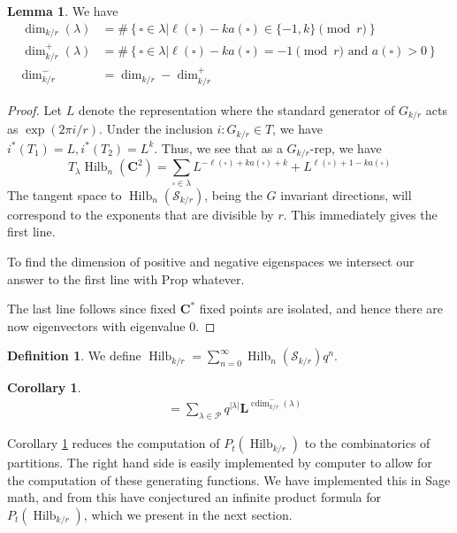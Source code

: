 \documentclass{amsart}[12pt]
\theoremstyle{definition}
\newtheorem{lemma}[dummy]{Lemma}
\newtheorem{corollary}[dummy]{Corollary}
\newtheorem{definition}[dummy]{Definition}
\newcommand{\C}{\mathbf{C}}
\newcommand{\LL}{\mathbf{L}}
\newcommand{\PP}{\mathcal{P}} %
\newcommand{\Sur}{\mathcal{S}}
\DeclareMathOperator{\Hilb}{Hilb}
\DeclareMathOperator{\cdim}{cdim}
\begin{document}
\begin{lemma} \label{lem:dimkr}
  We have
\begin{align*}
\dim_{k/r}(\lambda)&=\#\left\{\square\in\lambda \Big | \ell(\square)-k a(\square)\in\{-1,k\} \pmod r\right\} \\
\dim^+_{k/r}(\lambda)& =\#\left\{\square\in\lambda \Big | \ell(\square)-k a(\square)=-1 \pmod r \text{ and } a(\square)>0\right\} \\
\dim^-_{k/r} &= \dim_{k/r}-\dim^+_{k/r}
\end{align*}
\end{lemma}
\begin{proof}
Let $L$ denote the representation where the standard generator of $G_{k/r}$ acts as $\exp(2\pi i/r)$. Under the inclusion $i:G_{k/r}\in T$, we have $i^*(T_1)=L, i^*(T_2)=L^k$.  Thus, we see that as a $G_{k/r}$-rep, we have
$$T_\lambda \Hilb_n(\C^2)=\sum_{\square\in\lambda} L^{-\ell(\square)+ka(\square)+k}+L^{\ell(\square)+1-ka(\square)}$$
The tangent space to $\Hilb_n(\Sur_{k/r})$, being the $G$ invariant directions, will correspond to the exponents that are divisible by $r$.  This immediately gives the first line.

To find the dimension of positive and negative eigenspaces  we intersect our answer to the first line with Prop whatever.

The last line follows since fixed $\C^*$ fixed points are isolated, and hence there are now eigenvectors with eigenvalue 0.
\end{proof}

\begin{definition}
We define $\Hilb_{k/r}=\sum_{n=0}^\infty \Hilb_{n}(\Sur_{k/r})q^n$.
\end{definition}

\begin{corollary} \label{cor:orbibettipartitions}
\begin{align*} [P_t(\Hilb_{k/r})&=\sum_{\lambda\in\PP}q^{|\lambda|}t^{2\cdim^+_{k/r}(\lambda)} \\
  [\Hilb_{k/r}]&=\sum_{\lambda\in\PP}q^{|\lambda|}\LL^{\cdim^-_{k/r}(\lambda)}
\end{align*}
\end{corollary}

Corollary \ref{cor:orbibettipartitions} reduces the computation of $P_t(\Hilb_{k/r})$ to the combinatorics of partitions.  The right hand side is easily implemented by computer to allow for the computation of these generating functions.  We have implemented this in Sage math, and from this have conjectured an infinite product formula for $P_t(\Hilb_{k/r})$, which we present in the next section.
\end{document}
